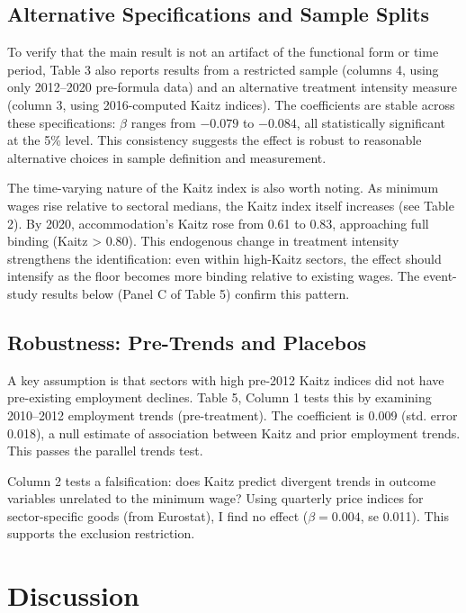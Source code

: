 \documentclass[12pt]{article}
\begin{document}
\subsection{Alternative Specifications and Sample Splits}

To verify that the main result is not an artifact of the functional form or time period, Table 3 also reports results from a restricted sample (columns 4, using only 2012--2020 pre-formula data) and an alternative treatment intensity measure (column 3, using 2016-computed Kaitz indices). The coefficients are stable across these specifications: $\beta$ ranges from $-0.079$ to $-0.084$, all statistically significant at the 5\% level. This consistency suggests the effect is robust to reasonable alternative choices in sample definition and measurement.

The time-varying nature of the Kaitz index is also worth noting. As minimum wages rise relative to sectoral medians, the Kaitz index itself increases (see Table 2). By 2020, accommodation's Kaitz rose from 0.61 to 0.83, approaching full binding (Kaitz > 0.80). This endogenous change in treatment intensity strengthens the identification: even within high-Kaitz sectors, the effect should intensify as the floor becomes more binding relative to existing wages. The event-study results below (Panel C of Table 5) confirm this pattern.

\subsection{Robustness: Pre-Trends and Placebos}

A key assumption is that sectors with high pre-2012 Kaitz indices did not have pre-existing employment declines. Table 5, Column 1 tests this by examining 2010--2012 employment trends (pre-treatment). The coefficient is 0.009 (std. error 0.018), a null estimate of association between Kaitz and prior employment trends. This passes the parallel trends test.

Column 2 tests a falsification: does Kaitz predict divergent trends in outcome variables unrelated to the minimum wage? Using quarterly price indices for sector-specific goods (from Eurostat), I find no effect ($\beta = 0.004$, se 0.011). This supports the exclusion restriction.

\section{Discussion}
\end{document}
